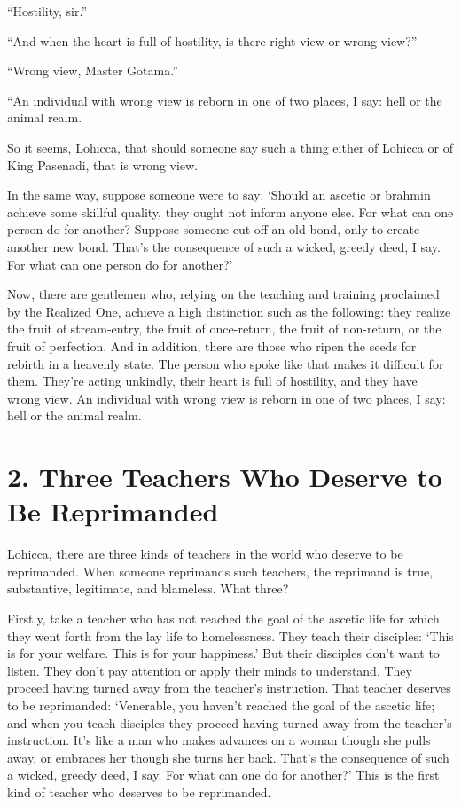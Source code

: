 \documentclass[12pt,openany]{book}%
\begin{document}
“Hostility, sir.” 

“And when the heart is full of hostility, is there right view or wrong view?” 

“Wrong view, Master Gotama.” 

“An individual with wrong view is reborn in one of two places, I say: hell or the animal realm. 

So it seems, Lohicca, that should someone say such a thing either of Lohicca or of King Pasenadi, that is wrong view. 

In the same way, suppose someone were to say: ‘Should an ascetic or brahmin achieve some skillful quality, they ought not inform anyone else. For what can one person do for another? Suppose someone cut off an old bond, only to create another new bond. That’s the consequence of such a wicked, greedy deed, I say. For what can one person do for another?’ 

Now, there are gentlemen who, relying on the teaching and training proclaimed by the Realized One, achieve a high distinction such as the following: they realize the fruit of stream-entry, the fruit of once-return, the fruit of non-return, or the fruit of perfection. And in addition, there are those who ripen the seeds for rebirth in a heavenly state. The person who spoke like that makes it difficult for them. They’re acting unkindly, their heart is full of hostility, and they have wrong view. An individual with wrong view is reborn in one of two places, I say: hell or the animal realm. 

\section*{2. Three Teachers Who Deserve to Be Reprimanded }

Lohicca, there are three kinds of teachers in the world who deserve to be reprimanded. When someone reprimands such teachers, the reprimand is true, substantive, legitimate, and blameless. What three? 

Firstly, take a teacher who has not reached the goal of the ascetic life for which they went forth from the lay life to homelessness. They teach their disciples: ‘This is for your welfare. This is for your happiness.’ But their disciples don’t want to listen. They don’t pay attention or apply their minds to understand. They proceed having turned away from the teacher’s instruction. That teacher deserves to be reprimanded: ‘Venerable, you haven’t reached the goal of the ascetic life; and when you teach disciples they proceed having turned away from the teacher’s instruction. It’s like a man who makes advances on a woman though she pulls away, or embraces her though she turns her back. That’s the consequence of such a wicked, greedy deed, I say. For what can one do for another?’ This is the first kind of teacher who deserves to be reprimanded. 
\end{document}
